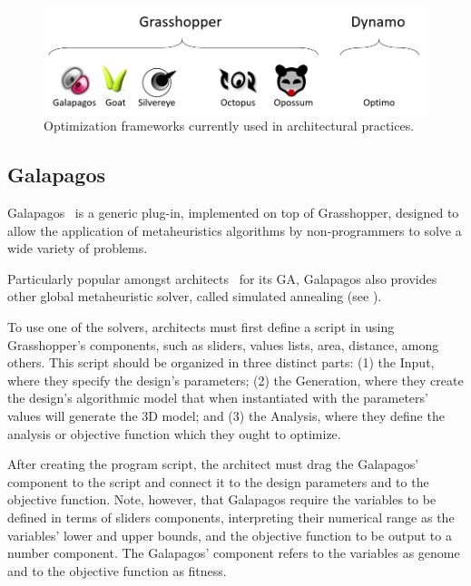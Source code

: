 	\begin{figure}
		\centering
		\includegraphics[width=\textwidth]{Images/Background/opt-plugins.PNG}
		\caption[Optimization Frameworks in the Architectural Practice]{Optimization frameworks currently used in architectural practices.}
		\label{fig:opt-plugins}
	\end{figure}
	
	\subsection{Galapagos}
	\label{subsec:galapagos}
	Galapagos~\cite{GALAPAGOS} is a generic plug-in, implemented on top of Grasshopper, designed to allow the application of metaheuristics algorithms by non-programmers to solve a wide variety of problems. 
	
	Particularly popular amongst architects~\cite{Wortmann2017ADO} for its \ac{GA}, Galapagos also provides other global metaheuristic solver, called simulated annealing (see ). 
	
	To use one of the solvers, architects must first define a script in using Grasshopper's components, such as sliders, values lists, area, distance, among others. This script should be organized in three distinct parts: (1) the Input, where they specify the design's parameters; (2) the Generation, where they create the design's algorithmic model that when instantiated with the parameters' values will generate the 3D model; and (3) the Analysis, where they define the analysis or objective function which they ought to optimize. 
	
	After creating the program script, the architect must drag the Galapagos' component to the script and connect it to the design parameters and to the objective function. Note, however, that Galapagos require the variables to be defined in terms of sliders components, interpreting their numerical range as the variables' lower and upper bounds, and the objective function to be output to a number component. The Galapagos' component refers to the variables as genome and to the objective function as fitness.
	
